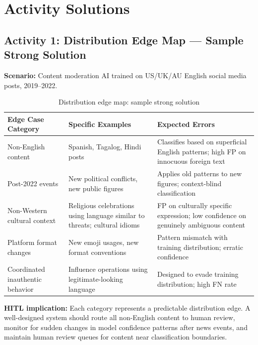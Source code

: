 \section{Activity Solutions}

\subsection{Activity 1: Distribution Edge Map --- Sample Strong Solution}

\textbf{Scenario:} Content moderation AI trained on US/UK/AU English social media posts, 2019--2022.

\begin{table}[htbp]
\caption{Distribution edge map: sample strong solution}
\label{tab:edge-map-solution}
\centering
\begin{tabular}{@{}p{3.5cm}p{3.5cm}p{4.5cm}@{}}
\toprule
\textbf{Edge Case Category} & \textbf{Specific Examples} & \textbf{Expected Errors} \\
\midrule
Non-English content & Spanish, Tagalog, Hindi posts & Classifies based on superficial English patterns; high FP on innocuous foreign text \\
Post-2022 events & New political conflicts, new public figures & Applies old patterns to new figures; context-blind classification \\
Non-Western cultural context & Religious celebrations using language similar to threats; cultural idioms & FP on culturally specific expression; low confidence on genuinely ambiguous content \\
Platform format changes & New emoji usages, new format conventions & Pattern mismatch with training distribution; erratic confidence \\
Coordinated inauthentic behavior & Influence operations using legitimate-looking language & Designed to evade training distribution; high FN rate \\
\bottomrule
\end{tabular}
\end{table}

\textbf{HITL implication:} Each category represents a predictable distribution edge. A well-designed system should route all non-English content to human review, monitor for sudden changes in model confidence patterns after news events, and maintain human review queues for content near classification boundaries.

